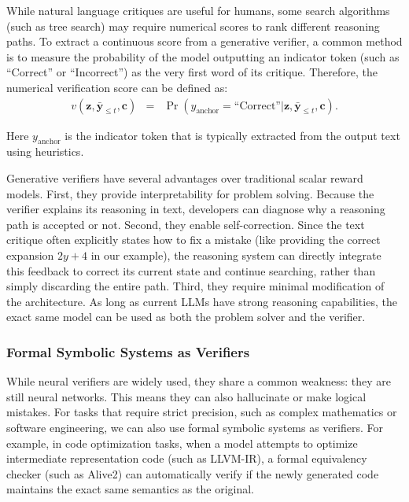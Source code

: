 While natural language critiques are useful for humans, some search algorithms (such as tree search) may require numerical scores to rank different reasoning paths. To extract a continuous score from a generative verifier, a common method is to measure the probability of the model outputting an indicator token (such as ``Correct'' or ``Incorrect'') as the very first word of its critique. Therefore, the numerical verification score can be defined as:
\begin{eqnarray}
v(\mathbf{z}, \bar{\mathbf{y}}_{\le t}, \mathbf{c}) & = & \Pr(y_{\mathrm{anchor}} = \text{``Correct''} | \mathbf{z}, \bar{\mathbf{y}}_{\le t}, \mathbf{c}).
\end{eqnarray}

\noindent Here $y_{\mathrm{anchor}}$ is the indicator token that is typically extracted from the output text using heuristics.

Generative verifiers have several advantages over traditional scalar reward models. First, they provide interpretability for problem solving. Because the verifier explains its reasoning in text, developers can diagnose why a reasoning path is accepted or not. Second, they enable self-correction. Since the text critique often explicitly states how to fix a mistake (like providing the correct expansion $2y + 4$ in our example), the reasoning system can directly integrate this feedback to correct its current state and continue searching, rather than simply discarding the entire path. Third, they require minimal modification of the architecture. As long as current LLMs have strong reasoning capabilities, the exact same model can be used as both the problem solver and the verifier.

\subsubsection{Formal Symbolic Systems as Verifiers}

While neural verifiers are widely used, they share a common weakness: they are still neural networks. This means they can also hallucinate or make logical mistakes. For tasks that require strict precision, such as complex mathematics or software engineering, we can also use formal symbolic systems as verifiers. For example, in code optimization tasks, when a model attempts to optimize intermediate representation code (such as LLVM-IR), a formal equivalency checker (such as Alive2) can automatically verify if the newly generated code maintains the exact same semantics as the original.

